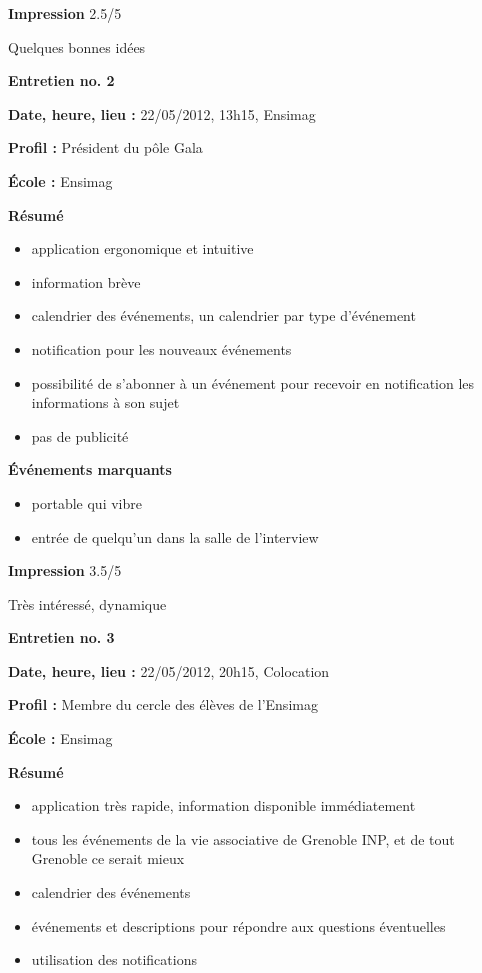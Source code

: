 \documentclass[a4paper, 11px]{article}
\begin{document}
\vspace{.25cm}
\textbf{Impression} 2.5/5 

Quelques bonnes idées



\vspace{.3cm}

 \textbf {\large Entretien no. 2}

\textbf{Date, heure, lieu : }
22/05/2012, 13h15, Ensimag

\textbf{Profil : }
Président du pôle Gala

\textbf{École : }
Ensimag

\textbf{Résumé}
	\begin{itemize}
		\item application ergonomique et intuitive
		\item information brève
		\item calendrier des événements, un calendrier par type d'événement
		\item notification pour les nouveaux événements
		\item possibilité de s'abonner à un événement pour recevoir en notification les informations à son sujet
		\item pas de publicité
	\end{itemize}

\vspace{.25cm}
\textbf{Événements marquants}
	\begin{itemize}
		\item portable qui vibre
		\item entrée de quelqu'un dans la salle de l'interview
	\end{itemize}

\vspace{.25cm}
\textbf{Impression} 3.5/5 

Très intéressé, dynamique



\vspace{.3cm}

 \textbf {\large Entretien no. 3}

\textbf{Date, heure, lieu : }
22/05/2012, 20h15, Colocation

\textbf{Profil : }
Membre du cercle des élèves de l'Ensimag

\textbf{École : }
Ensimag

\textbf{Résumé}
	\begin{itemize}
		\item application très rapide, information disponible immédiatement
		\item tous les événements de la vie associative de Grenoble INP, et de tout Grenoble ce serait mieux
		\item calendrier des événements
		\item événements et descriptions pour répondre aux questions éventuelles
		\item utilisation des notifications
	\end{itemize}
\end{document}
